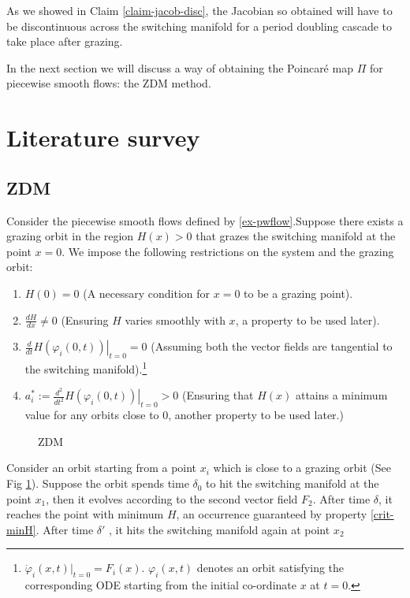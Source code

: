 \documentclass{book}
\renewcommand{\(}{\begin{columns}}
\renewcommand{\)}{\end{columns}}
\newcommand{\<}[1]{\begin{column}{#1}}
\renewcommand{\>}{\end{column}}
\begin{document}
As we showed in Claim \ref{claim-jacob-disc}, the Jacobian so obtained will 
have to be discontinuous across the switching manifold for a period doubling 
cascade to take place after grazing.  


In the next section we will discuss a way of obtaining the Poincaré map 
$\Pi$ for piecewise smooth flows: the ZDM method.  

\section{Literature survey}
\subsection{ZDM}
\label{prop-ZDM}
Consider the piecewise smooth flows defined by \eqref{ex-pwflow}.Suppose 
there exists a grazing orbit in the region $H(x)>0$ that grazes the switching 
manifold at the point $x=0$.  We impose the following restrictions on the 
system and the grazing orbit:

\begin{enumerate}
\item $H(0)=0$ (A necessary condition for $x=0$ to be a grazing point).
\item $\frac{dH}{dx}\neq 0$ (Ensuring $H$ varies smoothly with $x$, a property 
to be used later).
\item $\frac{d}{dt}\left.  H(\varphi_i(0,t))\right|_{t=0}=0$ (Assuming both 
the vector fields are tangential to the switching manifold).\footnote{
$\dot{\varphi}_i(x,t)|_{t=0}=F_i(x)$.  $\varphi_i(x,t)$ denotes an orbit 
satisfying the corresponding ODE starting from the initial co-ordinate 
$x$ at $t=0$.  }
\item $a_i^*:=\frac{d^2}{dt^2}\left.  H(\varphi_i(0,t))\right|_{t=0}>0$ 
(Ensuring that $H(x)$ attains a minimum value for any orbits close to $0$, 
another property to be used later.)\label{crit-minH}
\end{enumerate}


\begin{figure}[!htp]
\centering
\caption{ZDM}
\label{fig-ZDM}
\def\svgwidth{0.4\columnwidth}

\end{figure}


Consider an orbit starting from a point $x_i$ which is close to a grazing 
orbit (See Fig \ref{fig-ZDM}). Suppose the orbit spends time $\delta_0$ to hit 
the switching manifold at the point $x_1$, then it evolves according to the 
second vector field $F_2$.  After time $\delta$, it reaches the point with 
minimum $H$, an occurrence guaranteed by property \ref{crit-minH}. After time 
$\delta'$ , it hits the switching manifold again at point $x_2$
\end{document}
